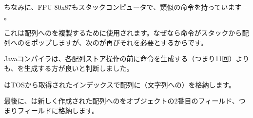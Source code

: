 ちなみに、FPU 80x87もスタックコンピュータで、類似の命令を持っています -- 。


これは配列へのを複製するために使用されます。なぜなら命令がスタックから配列へのをポップしますが、次のが再びそれを必要とするからです。

Javaコンパイラは、各配列ストア操作の前に命令を生成する（つまり11回）よりも、を生成する方が良いと判断しました。


は\ac{TOS}から取得されたインデックスで配列に（文字列への）を格納します。


最後に、は新しく作成された配列へのをオブジェクトの2番目のフィールド、つまりフィールドに格納します。